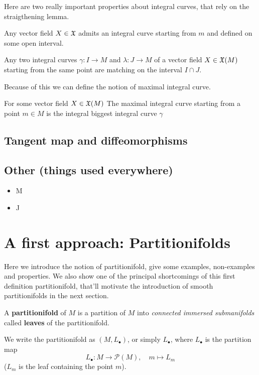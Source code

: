 	Here are two really important properties about integral curves, that rely on the straigthening lemma.

	\begin{prop}
		Any vector field $X \in \mathfrak{X}$ admits an integral curve starting from $m$ and defined on some open interval.
	\end{prop}

	\begin{prop}
		Any two integral curves $\gamma: I \to M$ and $\lambda: J \to M$ of a vector field $X \in \mathfrak{X}(M)$ starting from the same point are matching on the interval $I \cap J$.
	\end{prop}

	Because of this we can define the notion of maximal integral curve.

	\begin{definition}
		For some vector field $X \in \mathfrak{X}(M)$ The maximal integral curve starting from a point $m \in M$ is the integral biggest integral curve $\gamma$
	\end{definition}

	\subsection{Tangent map and diffeomorphisms}

	\subsection{Other (things used everywhere)}
        


		\begin{itemize}
			\item M
			\item J
		\end{itemize}


\section{A first approach: Partitionifolds}

	Here we introduce the notion of partitionifold, give some examples, non-examples and properties. We also show {\color{Red}one of the principal shortcomings} of this first definition partitionifold, that'll motivate the introduction of smooth partitionifolds in the next section.

	\begin{definition}
		A \textbf{partitionifold} of $M$ is a partition of $M$ into \emph{connected immersed submanifolds} called \textbf{leaves} of the partitionifold.

		We write the partitionifold as $(M, L_\bullet)$, or simply $L_\bullet$, where $L_\bullet$ is the partition map
		$$
			L_\bullet : M \to \mathcal{P}(M), \quad m \mapsto L_m
		$$
		($L_m$ is the leaf containing the point $m$).

	\end{definition}

